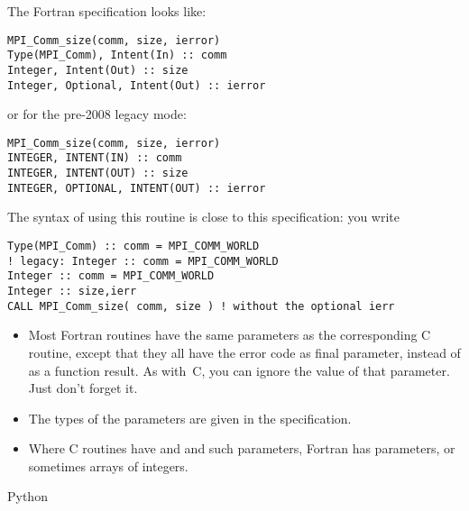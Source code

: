 The Fortran specification looks like:
\lstset{language=Fortran} %
\begin{lstlisting}
MPI_Comm_size(comm, size, ierror)
Type(MPI_Comm), Intent(In) :: comm
Integer, Intent(Out) :: size
Integer, Optional, Intent(Out) :: ierror
\end{lstlisting}
or for the pre-2008 legacy mode:
\begin{lstlisting}
MPI_Comm_size(comm, size, ierror)
INTEGER, INTENT(IN) :: comm
INTEGER, INTENT(OUT) :: size
INTEGER, OPTIONAL, INTENT(OUT) :: ierror
\end{lstlisting}
The syntax of using this routine is close to this specification: you
write
\begin{lstlisting}
Type(MPI_Comm) :: comm = MPI_COMM_WORLD
! legacy: Integer :: comm = MPI_COMM_WORLD
Integer :: comm = MPI_COMM_WORLD
Integer :: size,ierr
CALL MPI_Comm_size( comm, size ) ! without the optional ierr
\end{lstlisting}
\lstset{language=C} %

\begin{itemize}
\item Most Fortran routines have the same parameters as the
  corresponding C routine, except that they all have the error code as
  final parameter, instead of as a function result. As with~C, you can
  ignore the value of that parameter. Just don't forget it.
\item The types of the parameters are given in the specification.
\item Where C routines have  and  and such
  parameters, Fortran has  parameters, or sometimes arrays
  of integers.
\end{itemize}

 {Python}

